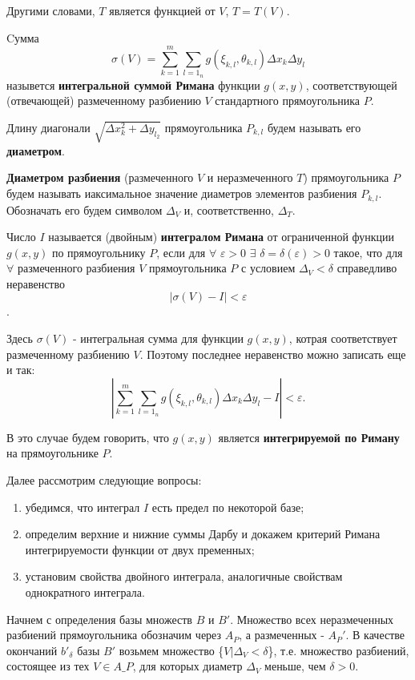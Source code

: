 Другими словами, $T$ является функцией от $V$, $T=T(V)$.
\begin{object}
Cумма $$\sigma (V)=\sum\limits_{k=1}^m\sum\limits_{{l=1}_n} g(\xi_{k,l},\theta_{k,l})\Delta x_k\Delta y_l$$ назывется \textbf{интегральной суммой Римана} функции $g(x,y)$, соответствующей (отвечающей) размеченному разбиению $V$ стандартного прямоугольника $P$.
\end{object}
\par Длину диагонали $\sqrt{\Delta x_k^2+\Delta y_{l_2}}$ прямоугольника $P_{k,l}$ будем называть его \textbf{диаметром}.
\begin{object} 
\textbf{Диаметром разбиения} (размеченного $V$ и неразмеченного $T$) прямоугольника $P$ будем называть иаксимальное значение диаметров элементов разбиения $P_{k,l}$. Обозначать его будем символом $\Delta_V$ и, соответственно, $\Delta_T$.
\end{object}
\begin{object} 
Число $I$ называется (двойным) \textbf{интегралом Римана} от ограниченной функции $g(x,y)$ по прямоугольнику $P$, если для $\forall$ $\varepsilon >0$ $\exists$ $\delta =\delta (\varepsilon )>0$ такое, что для $\forall$ размеченного разбиения $V$ прямоугольника $P$ с условием $\Delta_{V}<\delta$ справедливо неравенство $$|\sigma (V)-I|<\varepsilon$$.
\end{object}
\par Здесь $\sigma (V)$ - интегральная сумма для функции $g(x,y)$, котрая соответствует размеченному разбиению $V$. Поэтому последнее неравенство можно записать еще и так: $$|\sum\limits_{k=1}^m\sum\limits_{{l=1}_n} g(\xi_{k,l},\theta_{k,l})\Delta x_k\Delta y_l-I|<\varepsilon .$$
\par В это случае будем говорить, что $g(x,y)$ является \textbf{интегрируемой по Риману} на прямоугольнике $P$.
\par Далее рассмотрим следующие вопросы:
\begin{enumerate}
\item убедимся, что интеграл $I$ есть предел по некоторой базе;
\item определим верхние и нижние суммы Дарбу и докажем критерий Римана интегрируемости функции от двух пременных;
\item установим свойства двойного интеграла, аналогичные свойствам однократного интеграла.
\end{enumerate}
\par Начнем с определения базы множеств $B$ и $B'$. Множество всех неразмеченных разбиений прямоугольника обозначим через $A_P$, а размеченных -  $A_P'$. В качестве окончаний $b'_{\delta}$ базы $B'$ возьмем множество \{$V|\Delta_V<\delta$\}, т.е. множество разбиений, состоящее из тех $V\in A\_P$, для которых диаметр $\Delta_V$ меньше, чем $\delta >0$.
